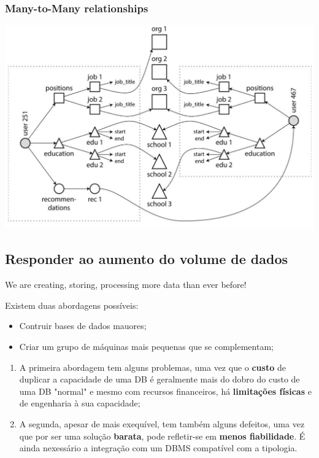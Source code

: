 \documentclass{article}
\begin{document}
\subsubsection{Many-to-Many relationships}

\begin{center}
  \includegraphics[scale=0.25]{6}
\end{center}

\pagebreak

\subsection{Responder ao aumento do volume de dados}

We are creating, storing, processing more data than ever before!

\vspace{3mm}
Existem duas abordagens possíveis:
\begin{itemize}
  \item Contruir bases de dados mauores;
  \item Criar um grupo de máquinas mais pequenas que se complementam;
\end{itemize}

\begin{enumerate}
  \item A primeira abordagem tem alguns problemas, uma vez que o \textbf{custo}
  de duplicar a capacidade de uma DB é geralmente mais do dobro do custo de uma
  DB "normal" e mesmo com recursos financeiros, há \textbf{limitações físicas} e de
  engenharia à sua capacidade;
  
  \item A segunda, apesar de mais exequível, tem também alguns defeitos, uma vez
  que por ser uma solução \textbf{barata}, pode refletir-se em \textbf{menos
  fiabilidade}. É ainda nexessário a integração com um DBMS compatível com
  a tipologia.
\end{enumerate}
\end{document}
